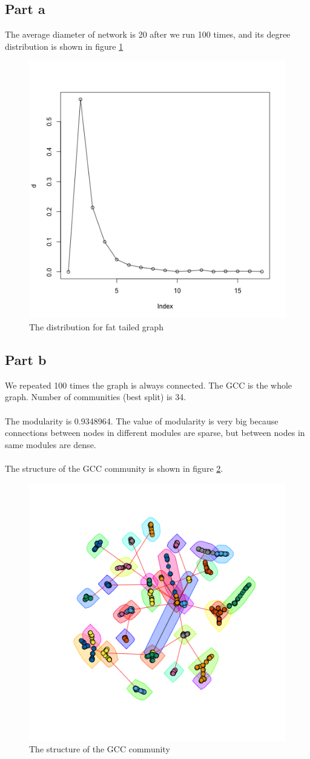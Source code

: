 \documentclass{article}
\begin{document}
\subsection{Part a}
The average diameter of network is 20 after we run 100 times, and its degree distribution is shown in figure \ref{fig:p2_1}
\begin{figure}[htbp]
\centering
\includegraphics[width=.6\textwidth]{p2_1.png}
\caption{The distribution for fat tailed graph}
\label{fig:p2_1}
\end{figure}

\subsection{Part b}
We repeated 100 times the graph is always connected.
The GCC is the whole graph.
Number of communities (best split) is 34.\\
\\
The modularity is 0.9348964. The value of modularity is very big because connections between nodes in different modules are sparse, but between nodes in same modules are dense. \\
\\
The structure of the GCC community is shown in figure \ref{fig:p2_3}.
\begin{figure}[htbp]
\centering
\includegraphics[width=.6\textwidth]{p2_3.png}
\caption{The structure of the GCC community}
\label{fig:p2_3}
\end{figure}
\end{document}
